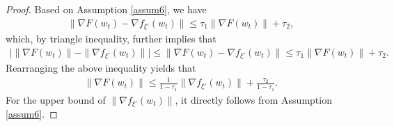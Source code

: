 \documentclass[10pt]{article} %
\def\eqref#1{equation~\ref{#1}}
\newtheorem{proof}{Proof}
\begin{document}
\mainlemmatwo*
\begin{proof}\label{Proof of Lemma 2}
    Based on Assumption \ref{assum6}, we have
    \begin{align}
        \| \nabla F(w_t)-\nabla f_{\xi'}(w_t)\| \leq \tau_1 \|\nabla F(w_t) \|+\tau_2,\nonumber
    \end{align}
    which, by triangle inequality, further implies that
    \begin{align}
        \big| \| \nabla F(w_t) \| -\|\nabla f_{\xi'}(w_t)\|\big|\leq 
        \| \nabla F(w_t)-\nabla f_{\xi'}(w_t)\|\leq \tau_1 \|\nabla F(w_t) \|+\tau_2.\nonumber
    \end{align}
    Rearranging the above inequality yields that 
    \begin{align}
        \|\nabla F(w_t) \|\leq \frac{1}{1-\tau_1}\|\nabla f_{\xi'}(w_t) \|+\frac{\tau_2}{1-\tau_1}.\nonumber
    \end{align}
    For the upper bound of $\|\nabla f_{\xi'}(w_t) \|$, it directly follows from Assumption \ref{assum6}.
\end{proof}
\end{document}
